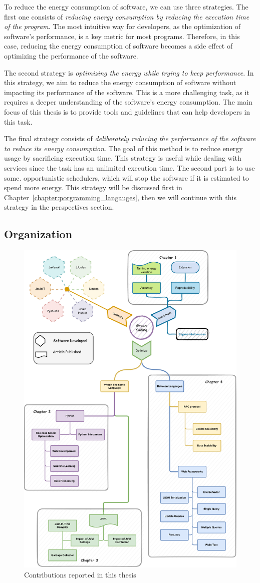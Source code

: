 To reduce the energy consumption of software, we can use three strategies.
The first one consists of \emph{reducing energy consumption by reducing the execution time of the program}.
The most intuitive way for developers, as the optimization of software's performance, is a key metric for most programs.
Therefore, in this case, reducing the energy consumption of software becomes a side effect of optimizing the performance of the software.

The second strategy is \emph{optimizing the energy while trying to keep performance}.
In this strategy, we aim to reduce the energy consumption of software without impacting its performance of the software.
This is a more challenging task, as it requires a deeper understanding of the software's energy consumption.
The main focus of this thesis is to provide tools and guidelines that can help developers in this task.

The final strategy consists of \emph{deliberately reducing the performance of the software to reduce its energy consumption}. 
The goal of this method is to reduce energy usage by sacrificing execution time.
This strategy is useful while dealing with services since the task has an unlimited execution time.
The second part is to use some. opportunistic schedulers, which will stop the software if it is estimated to spend more energy. 
This strategy will be discussed first in Chapter~\ref{chapter:porgramming_langauges}, then we will continue with this strategy in the perspectives section.

\subsection{Organization}
\begin{figure}[!h]
    \centering
    \includegraphics[width=.7\textwidth,height=\textheight,keepaspectratio]{chapters/thesis_contributions.pdf}
    \caption{Contributions reported in this thesis}
    \label{fig:thesis_contributions}
\end{figure}

